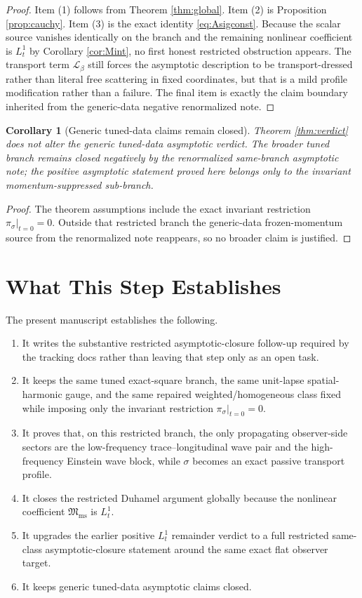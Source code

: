 \documentclass[11pt]{article}
\newcommand{\Ell}{\mathcal{L}}
\newtheorem{corollary}{Corollary}
\begin{document}
\begin{proof}
Item (1) follows from Theorem \ref{thm:global}. Item (2) is Proposition \ref{prop:cauchy}. Item (3) is the exact identity \eqref{eq:Asigconst}. Because the scalar source vanishes identically on the branch and the remaining nonlinear coefficient is \(L_t^1\) by Corollary \ref{cor:Mint}, no first honest restricted obstruction appears. The transport term \(\Ell_\beta\) still forces the asymptotic description to be transport-dressed rather than literal free scattering in fixed coordinates, but that is a mild profile modification rather than a failure. The final item is exactly the claim boundary inherited from the generic-data negative renormalized note.
\end{proof}

\begin{corollary}[Generic tuned-data claims remain closed]
\label{cor:genericclosed}
Theorem \ref{thm:verdict} does not alter the generic tuned-data asymptotic verdict. The broader tuned branch remains closed negatively by the renormalized same-branch asymptotic note; the positive asymptotic statement proved here belongs only to the invariant momentum-suppressed sub-branch.
\end{corollary}

\begin{proof}
The theorem assumptions include the exact invariant restriction \(\pi_\sigma|_{t=0}=0\). Outside that restricted branch the generic-data frozen-momentum source from the renormalized note reappears, so no broader claim is justified.
\end{proof}

\section{What This Step Establishes}

The present manuscript establishes the following.
\begin{enumerate}
    \item It writes the substantive restricted asymptotic-closure follow-up required by the tracking docs rather than leaving that step only as an open task.
    \item It keeps the same tuned exact-square branch, the same unit-lapse spatial-harmonic gauge, and the same repaired weighted/homogeneous class fixed while imposing only the invariant restriction \(\pi_\sigma|_{t=0}=0\).
    \item It proves that, on this restricted branch, the only propagating observer-side sectors are the low-frequency trace--longitudinal wave pair and the high-frequency Einstein wave block, while \(\sigma\) becomes an exact passive transport profile.
    \item It closes the restricted Duhamel argument globally because the nonlinear coefficient \(\mathfrak M_{\mathrm{ms}}\) is \(L_t^1\).
    \item It upgrades the earlier positive \(L_t^1\) remainder verdict to a full restricted same-class asymptotic-closure statement around the same exact flat observer target.
    \item It keeps generic tuned-data asymptotic claims closed.
\end{enumerate}
\end{document}
